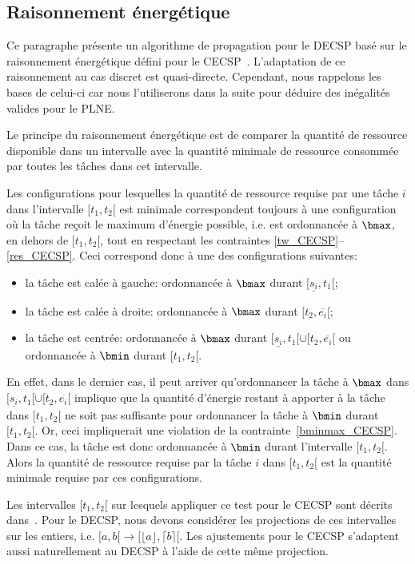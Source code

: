 \subsection{Raisonnement énergétique}


Ce paragraphe présente un algorithme de propagation pour le
DECSP basé sur le raisonnement énergétique défini pour le
CECSP~\cite{Nattaf2015}.  L'adaptation de ce raisonnement au cas
discret est quasi-directe. Cependant, nous rappelons les bases de
celui-ci car nous l'utiliserons dans la suite pour déduire des
inégalités valides pour le PLNE.

Le principe du raisonnement énergétique est de comparer la quantité de
ressource disponible dans un intervalle avec la quantité minimale de
ressource consommée par toutes les tâches dans cet intervalle.

Les configurations pour lesquelles la quantité de ressource requise
par une tâche $i$ dans l'intervalle $[t_1,t_2[$ est minimale
correspondent toujours à une configuration où la tâche reçoit le
maximum d'énergie possible, i.e. est ordonnancée à $\bmax$, en dehors
de $[t_1,t_2[$, tout en respectant les contraintes
\eqref{tw_CECSP}--\eqref{res_CECSP}. Ceci correspond donc à une des
configurations suivantes:
\begin{itemize}
\item la tâche est calée à gauche: ordonnancée à $\bmax$ durant
$[\underline{s_i},t_1[$;
\item la tâche est calée à droite: ordonnancée à $\bmax$ durant
$[t_2,\overline{e_i}[$;
\item la tâche est centrée: ordonnancée à $\bmax$ durant
$[\underline{s_i},t_1[ \cup [t_2,\overline{e_i}[$ ou ordonnancée à
$\bmin$ durant $[t_1,t_2[$.
\end{itemize} En effet, dans le dernier cas, il peut arriver
qu'ordonnancer la tâche à $\bmax$ dans $[\underline{s_i},t_1[ \cup
[t_2,\overline{e_i}[$ implique que la quantité d'énergie restant à
apporter à la tâche dans $[t_1,t_2[$ ne soit pas suffisante pour
ordonnancer la tâche à $\bmin$ durant $[t_1,t_2[$. Or, ceci
impliquerait une violation de la
contrainte~\eqref{bminmax_CECSP}. Dans ce cas, la tâche est donc
ordonnancée à $\bmin$ durant l'intervalle $[t_1,t_2[$. Alors la
quantité de ressource requise par la tâche $i$ dans $[t_1,t_2[$ est la
quantité minimale requise par ces configurations.  

Les intervalles $[t_1,t_2[$ sur lesquels appliquer ce test pour le
CECSP sont décrits dans~\cite{Nattaf2015}. Pour le DECSP, nous devons
considérer les projections de ces intervalles sur les entiers,
i.e. $[a,b[ \rightarrow [\lfloor a \rfloor, \lceil b \rceil[$.  Les
ajustements pour le CECSP s'adaptent aussi naturellement au DECSP à
l'aide de cette même projection.

